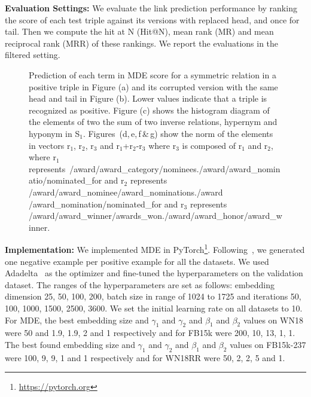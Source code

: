 \documentclass{ecai}
\begin{document}
\textbf{Evaluation Settings:} 
We evaluate the link prediction performance by ranking the score of each test triple against its versions with replaced head, and once for tail. Then we compute the hit at N (Hit@N), mean rank (MR) and mean reciprocal rank (MRR) of these rankings. We report the evaluations in the filtered setting. \begin{figure*}[t]
 \centering
  \hspace{1em}
    
    
    
    \caption{Prediction of each term in MDE score for a symmetric relation in a positive triple in Figure (a) and its corrupted version with the same head and tail in Figure (b). Lower values indicate that a triple is recognized as positive. Figure (c) shows the histogram diagram of the elements of two the sum of two inverse relations, hypernym and hyponym in S$_1$. Figures~(d,\,e,\,f\,\&\,g) show the norm of the elements in vectors r$_1$, r$_2$, r$_3$ and r$_1$+r$_2$-r$_3$ where r$_3$ is composed of r$_1$ and r$_2$, where r$_1$ represents~\footnotesize/award/award\_category/nominees./award/award\_nominatio/nominated\_for \normalsize and r$_2$ represents  \footnotesize/award/award\_nominee/award\_nominations./award /award\_nomination/nominated\_for \normalsize and r$_3$ represents  \footnotesize /award/award\_winner/awards\_won./award/award\_honor/award\_winner\normalsize.} 
\label{fig:relationPatterns}
\end{figure*}

\textbf{Implementation:}
We implemented MDE in PyTorch\footnote{\url{https://pytorch.org}}.  Following~\cite{bordes2011learning}, we generated one negative example per positive example for all the datasets. We used Adadelta~\cite{zeiler2012adadelta} as the optimizer and fine-tuned the hyperparameters on the validation dataset. The ranges of the hyperparameters are set as follows: embedding dimension 25, 50, 100, 200, batch size in range of 1024 to 1725 and iterations 50, 100, 1000, 1500, 2500, 3600. We set the initial learning rate on all datasets to 10. 
For MDE, the best embedding size and $\gamma_1$ and $\gamma_2$ and $\beta_1$ and $\beta_2$ values on WN18 were 50 and 1.9, 1.9, 2 and 1 respectively and for FB15k were 200, 10, 13, 1, 1. The best found embedding size and $\gamma_1$ and $\gamma_2$ and $\beta_1$ and $\beta_2$ values on FB15k-237 were 100, 9, 9, 1 and 1 respectively and for WN18RR were 50, 2, 2, 5 and 1. 
\end{document}
